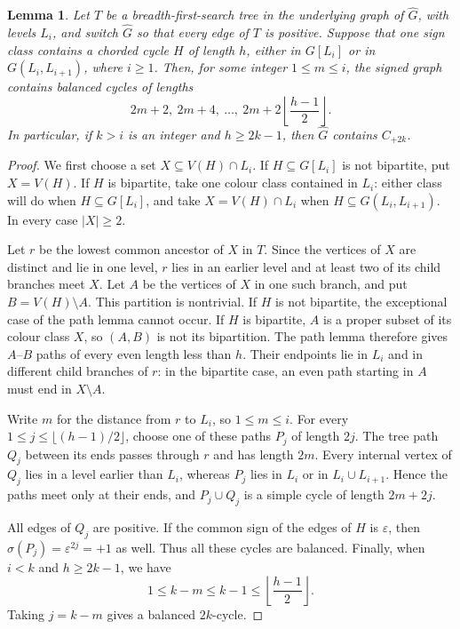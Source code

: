 \documentclass{article}
\newtheorem{lemma}[theorem]{Lemma}
\theoremstyle{definition}
\theoremstyle{remark}
\begin{document}
\begin{lemma}\label{lem:monochromatic-BFS-closure}
Let $T$ be a breadth-first-search tree in the underlying graph of
$\widehat G$, with levels $L_i$, and switch $\widehat G$ so that every
edge of $T$ is positive.  Suppose that one sign class contains a chorded
cycle $H$ of length $h$, either in $G[L_i]$ or in $G(L_i,L_{i+1})$,
where $i\geq1$.  Then, for some integer $1\leq m\leq i$, the signed
graph contains balanced cycles of lengths
\[
2m+2,\ 2m+4,\ \ldots,\ 2m+2\left\lfloor\frac{h-1}{2}\right\rfloor.
\]
In particular, if $k>i$ is an integer and $h\geq2k-1$, then $\widehat G$ contains
$C_{+2k}$.
\end{lemma}
\begin{proof}
We first choose a set $X\subseteq V(H)\cap L_i$.  If
$H\subseteq G[L_i]$ is not bipartite, put $X=V(H)$.  If $H$ is
bipartite, take one colour class contained in $L_i$: either class will do
when $H\subseteq G[L_i]$, and take $X=V(H)\cap L_i$ when
$H\subseteq G(L_i,L_{i+1})$.  In every case $|X|\geq2$.

Let $r$ be the lowest common ancestor of $X$ in $T$.  Since the vertices
of $X$ are distinct and lie in one level, $r$ lies in an earlier level and
at least two of its child branches meet $X$.  Let $A$ be the vertices of
$X$ in one such branch, and put $B=V(H)\setminus A$.  This partition is
nontrivial.  If $H$ is not bipartite, the exceptional case of the path
lemma cannot occur.  If $H$ is bipartite, $A$ is a proper subset of its
colour class $X$, so $(A,B)$ is not its bipartition.  The path lemma
therefore gives $A$--$B$ paths of every even length less than $h$.
Their endpoints lie in $L_i$ and in different child branches of $r$:
in the bipartite case, an even path starting in $A$ must end in
$X\setminus A$.

Write $m$ for the distance from $r$ to $L_i$, so $1\leq m\leq i$.
For every $1\leq j\leq\lfloor(h-1)/2\rfloor$, choose one of these paths
$P_j$ of length $2j$.  The tree path $Q_j$ between its ends passes through
$r$ and has length $2m$.  Every internal vertex of $Q_j$ lies in a level
earlier than $L_i$, whereas $P_j$ lies in $L_i$ or in
$L_i\cup L_{i+1}$.  Hence the paths meet only at their ends, and
$P_j\cup Q_j$ is a simple cycle of length $2m+2j$.

All edges of $Q_j$ are positive.  If the common sign of the edges of
$H$ is $\varepsilon$, then $\sigma(P_j)=\varepsilon^{2j}=+1$ as well.
Thus all these cycles are balanced.  Finally, when $i<k$ and
$h\geq2k-1$, we have
\[
1\leq k-m\leq k-1\leq\left\lfloor\frac{h-1}{2}\right\rfloor.
\]
Taking $j=k-m$ gives a balanced $2k$-cycle.
\end{proof}
\end{document}
